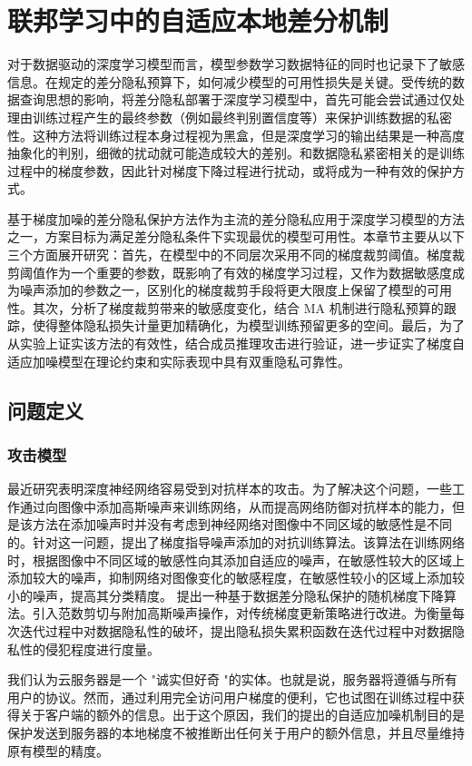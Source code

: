 \chapter{联邦学习中的自适应本地差分机制}

\label{ch3}
对于数据驱动的深度学习模型而言，模型参数学习数据特征的同时也记录下了敏感信息。在规定的差分隐私预算下，如何减少模型的可用性损失是关键。受传统的数据查询思想的影响，将差分隐私部署于深度学习模型中，首先可能会尝试通过仅处理由训练过程产生的最终参数（例如最终判别置信度等）来保护训练数据的私密性。这种方法将训练过程本身过程视为黑盒，但是深度学习的输出结果是一种高度抽象化的判别，细微的扰动就可能造成较大的差别。和数据隐私紧密相关的是训练过程中的梯度参数，因此针对梯度下降过程进行扰动，或将成为一种有效的保护方式。 

基于梯度加噪的差分隐私保护方法作为主流的差分隐私应用于深度学习模型的方法之一，方案目标为满足差分隐私条件下实现最优的模型可用性。本章节主要从以下三个方面展开研究：首先，在模型中的不同层次采用不同的梯度裁剪阈值。梯度裁剪阈值作为一个重要的参数，既影响了有效的梯度学习过程，又作为数据敏感度成为噪声添加的参数之一，区别化的梯度裁剪手段将更大限度上保留了模型的可用性。其次，分析了梯度裁剪带来的敏感度变化，结合 MA 机制进行隐私预算的跟踪，使得整体隐私损失计量更加精确化，为模型训练预留更多的空间。最后，为了从实验上证实该方法的有效性，结合成员推理攻击进行验证，进一步证实了梯度自适应加噪模型在理论约束和实际表现中具有双重隐私可靠性。 


\section{问题定义}
\subsection{攻击模型}
最近研究表明深度神经网络容易受到对抗样本的攻击。为了解决这个问题，一些工作通过向图像中添加高斯噪声来训练网络，从而提高网络防御对抗样本的能力，但是该方法在添加噪声时并没有考虑到神经网络对图像中不同区域的敏感性是不同的。针对这一问题，提出了梯度指导噪声添加的对抗训练算法。该算法在训练网络时，根据图像中不同区域的敏感性向其添加自适应的噪声，在敏感性较大的区域上添加较大的噪声，抑制网络对图像变化的敏感程度，在敏感性较小的区域上添加较小的噪声，提高其分类精度。
提出一种基于数据差分隐私保护的随机梯度下降算法。引入范数剪切与附加高斯噪声操作，对传统梯度更新策略进行改进。为衡量每次迭代过程中对数据隐私性的破坏，提出隐私损失累积函数在迭代过程中对数据隐私性的侵犯程度进行度量。

我们认为云服务器是一个 "诚实但好奇 "的实体。也就是说，服务器将遵循与所有用户的协议。然而，通过利用完全访问用户梯度的便利，它也试图在训练过程中获得关于客户端的额外的信息。出于这个原因，我们的提出的自适应加噪机制目的是保护发送到服务器的本地梯度不被推断出任何关于用户的额外信息，并且尽量维持原有模型的精度。


